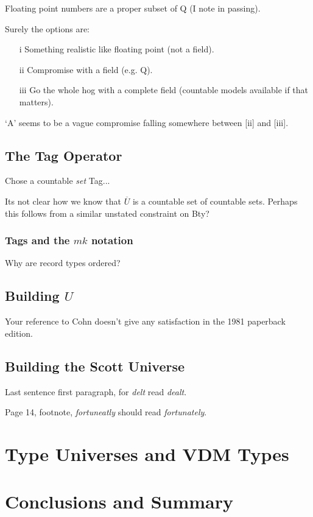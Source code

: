 Floating point numbers are a proper subset of Q (I note in passing).

Surely the options are:

\begin{enumerate}
\item [i]
Something realistic like floating point (not a field).
\item [ii]
Compromise with a field (e.g. Q).
\item [iii]
Go the whole hog with a complete field (countable models available if that
matters).
\end{enumerate}

`A' seems to be a vague compromise falling somewhere between [ii] and [iii].

\subsection{The Tag Operator}

Chose a countable {\em set} Tag...

Its not clear how we know that $\overline{U}$ is a countable set of countable sets.
Perhaps this follows from a similar unstated constraint on Bty?
\subsubsection{Tags and the $mk$ notation}

Why are record types ordered?
\subsection{Building $U$}

Your reference to Cohn doesn't give any satisfaction in the
1981 paperback edition.
\subsection{Building the Scott Universe}

Last sentence first paragraph, for {\em delt} read {\em dealt}. 

Page 14, footnote, {\em fortuneatly} should read {\em fortunately}.
\section{Type Universes and VDM Types}

\section{Conclusions and Summary}

